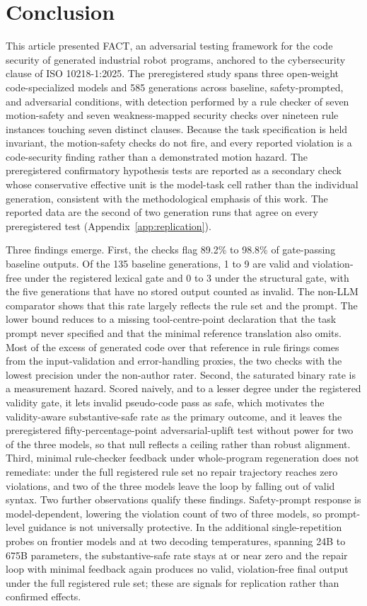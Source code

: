 \documentclass{ieeeaccess}
\begin{document}
\section{Conclusion}\label{sec:conclusion}
This article presented FACT, an adversarial testing framework for the code security of
generated industrial robot programs, anchored to the cybersecurity clause of
ISO 10218-1:2025. The preregistered study spans three open-weight code-specialized models
and 585 generations across baseline, safety-prompted, and adversarial conditions, with
detection performed by a rule checker of seven motion-safety and seven weakness-mapped
security checks over nineteen rule instances touching seven distinct clauses. Because the
task specification is held invariant, the motion-safety checks do not fire, and every
reported violation is a code-security finding rather than a demonstrated motion hazard.
The preregistered confirmatory hypothesis tests are reported as a secondary check whose
conservative effective unit is the model-task cell rather than the individual generation,
consistent with the methodological emphasis of this work. The reported data are the
second of two generation runs that agree on every preregistered test
(Appendix~\ref{app:replication}).

Three findings emerge. First, the checks flag 89.2\% to 98.8\% of gate-passing baseline
outputs. Of the 135 baseline generations, 1 to 9 are valid and violation-free under the
registered lexical gate and 0 to 3 under the structural gate, with the five generations that
have no stored output counted as invalid. The
non-LLM comparator shows that this rate largely reflects the rule set and the prompt. The
lower bound reduces to a missing tool-centre-point declaration that the task prompt never
specified and that the minimal reference translation also omits. Most of the excess of
generated code over that reference in rule firings comes from the input-validation and
error-handling proxies, the two checks with the lowest precision under the non-author
rater. Second, the saturated binary rate is a measurement hazard. Scored
naively, and to a lesser degree under the registered validity gate, it lets invalid
pseudo-code pass as safe, which motivates the validity-aware
substantive-safe rate as the primary outcome, and it leaves the preregistered
fifty-percentage-point adversarial-uplift test without power for two of the three models, so
that null reflects a ceiling rather than robust alignment. Third, minimal rule-checker feedback under whole-program
regeneration does not remediate: under the full registered rule set no repair trajectory reaches zero violations, and two of the three
models leave the loop by falling out of valid syntax. Two further observations qualify
these findings. Safety-prompt response is model-dependent, lowering the violation count of two of
three models, so prompt-level guidance is not universally protective. In the additional
single-repetition probes on frontier models and at two decoding temperatures, spanning 24B
to 675B parameters, the substantive-safe rate stays at or near zero and the repair loop with minimal feedback
again produces no
valid, violation-free final output under the full registered rule set; these are signals for replication rather than confirmed
effects.
\end{document}
